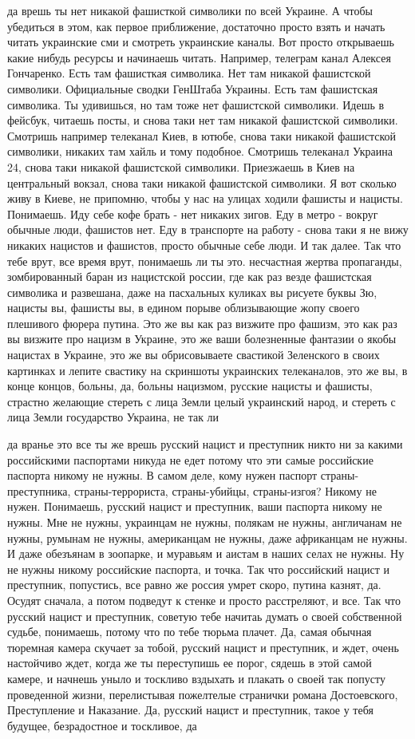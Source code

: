 да врешь ты нет никакой фашисткой символики по всей Украине. А чтобы убедиться
в этом, как первое приближение, достаточно просто взять и начать читать
украинские сми и смотреть украинские каналы. Вот просто открываешь какие нибудь
ресурсы и начинаешь читать. Например, телеграм канал Алексея Гончаренко. Есть
там фашисткая символика. Нет там никакой фашистской символики. Официальные
сводки ГенШтаба Украины. Есть там фашистская символика. Ты удивишься, но там
тоже нет фашистской символики. Идешь в фейсбук, читаешь посты, и снова таки нет
там никакой фашистской символики. Смотришь например телеканал Киев, в ютюбе,
снова таки никакой фашистской символики, никаких там хайль и тому подобное.
Смотришь телеканал Украина 24, снова таки никакой фашистской символики.
Приезжаешь в Киев на центральный вокзал, снова таки никакой фашистской
символики. Я вот сколько живу в Киеве, не припомню, чтобы у нас на улицах
ходили фашисты и нацисты. Понимаешь.  Иду себе кофе брать - нет никаких зигов.
Еду в метро - вокруг обычные люди, фашистов нет.  Еду в транспорте на работу -
снова таки я не вижу никаких нацистов и фашистов, просто обычные себе люди.  И
так далее. Так что тебе врут, все время врут, понимаешь ли ты это.  несчастная
жертва пропаганды, зомбированный баран из нацистской россии, где как раз везде
фашистская символика и развешана, даже на пасхальных куликах вы рисуете буквы
Зю, нацисты вы, фашисты вы, в едином порыве облизывающие жопу своего плешивого
фюрера путина. Это же вы как раз визжите про фашизм, это как раз вы визжите про
нацизм в Украине, это же ваши болезненные фантазии о якобы нацистах в Украине,
это же вы обрисовываете свастикой Зеленского в своих картинках и лепите
свастику на скриншоты украинских телеканалов, это же вы, в конце концов,
больны, да, больны нацизмом, русские нацисты и фашисты, страстно желающие
стереть с лица Земли целый украинский народ, и стереть с лица Земли государство
Украина, не так ли

да вранье это все ты же врешь русский нацист и преступник никто ни за какими
российскими паспортами никуда не едет потому что эти самые российские паспорта
никому не нужны. В самом деле, кому нужен паспорт страны-преступника,
страны-террориста, страны-убийцы, страны-изгоя? Никому не нужен. Понимаешь,
русский нацист и преступник, ваши паспорта никому не нужны. Мне не нужны,
украинцам не нужны, полякам не нужны, англичанам не нужны, румынам не нужны,
американцам не нужны, даже африканцам не нужны. И даже обезъянам в зоопарке, и
муравьям и аистам в наших селах не нужны. Ну не нужны никому российские
паспорта, и точка. Так что российский нацист и преступник, попустись, все равно
же россия умрет скоро, путина казнят, да. Осудят сначала, а потом подведут к
стенке и просто расстреляют, и все. Так что русский нацист и преступник,
советую тебе начитаь думать о своей собственной судьбе, понимаешь, потому что
по тебе тюрьма плачет. Да, самая обычная тюремная камера скучает за тобой,
русский нацист и преступник, и ждет, очень настойчиво ждет, когда же ты
переступишь ее порог, сядешь в этой самой камере, и начнешь уныло и тоскливо
вздыхать и плакать о своей так попусту проведенной жизни, перелистывая
пожелтелые странички романа Достоевского, Преступление и Наказание. Да, русский
нацист и преступник, такое у тебя будущее, безрадостное и тоскливое, да

